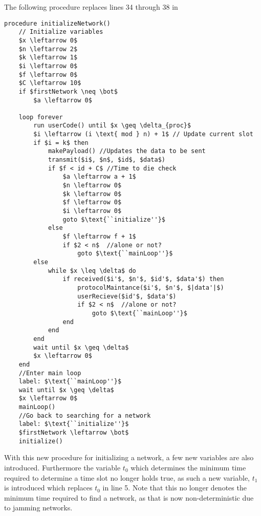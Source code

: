 
\bigskip \noindent
The following procedure replaces lines 34 through 38 in 
\begin{lstlisting}[label=lst:networkMultiStartCCRC,style=pseudocode,mathescape=true,caption={Pseudocode example of the procedure initializeNetwork() for CCRC for the multiple device activation problem.}]
procedure initializeNetwork()
    // Initialize variables
    $x \leftarrow 0$
    $n \leftarrow 2$
    $k \leftarrow 1$
    $i \leftarrow 0$
    $f \leftarrow 0$
    $C \leftarrow 10$
    if $firstNetwork \neq \bot$
        $a \leftarrow 0$
    
    loop forever       
        run userCode() until $x \geq \delta_{proc}$
        $i \leftarrow (i \text{ mod } n) + 1$ // Update current slot
        if $i = k$ then
            makePayload() //Updates the data to be sent
            transmit($i$, $n$, $id$, $data$)
            if $f < id + C$ //Time to die check
                $a \leftarrow a + 1$
                $n \leftarrow 0$
                $k \leftarrow 0$
                $f \leftarrow 0$
                $i \leftarrow 0$
                goto $\text{``initialize''}$
            else
                $f \leftarrow f + 1$
                if $2 < n$  //alone or not?
                    goto $\text{``mainLoop''}$
        else
            while $x \leq \delta$ do
                if received($i'$, $n'$, $id'$, $data'$) then
                    protocolMaintance($i'$, $n'$, $|data'|$)
                    userRecieve($id'$, $data'$)
                    if $2 < n$  //alone or not?
                        goto $\text{``mainLoop''}$
                end
            end
        end
        wait until $x \geq \delta$
        $x \leftarrow 0$ 
    end
    //Enter main loop
    label: $\text{``mainLoop''}$
    wait until $x \geq \delta$
    $x \leftarrow 0$
    mainLoop()
    //Go back to searching for a network
    label: $\text{``initialize''}$
    $firstNetwork \leftarrow \bot$
    initialize()
\end{lstlisting}
\noindent
With this new procedure for initializing a network, a few new variables are also introduced.
Furthermore the variable $t_0$ which determines the minimum time required to determine a time slot no longer holds true, as such a new variable, $t_1$ is introduced which replaces $t_0$ in  line 5.
Note that this no longer denotes the minimum time required to find a network, as that is now non-deterministic due to jamming networks.
